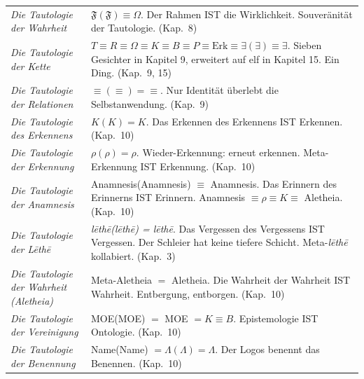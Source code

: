 \documentclass[10pt, openany, oneside]{book}
\renewcommand{\footnotesize}{\fontsize{8.5}{11}\selectfont}
\begin{document}
{\footnotesize
\noindent\begin{tabular}{@{} p{} @{\hspace{0.5em}} p{} @{}}

\textit{Die Tautologie der Wahrheit} & $\mathfrak{F}(\mathfrak{F}) \equiv \Omega$. Der Rahmen IST die Wirklichkeit. Souveränität der Tautologie. (Kap.\ 8) \\[0.3em]

\textit{Die Tautologie der Kette} & $T \equiv R \equiv \Omega \equiv K \equiv B \equiv P \equiv \text{Erk} \equiv \exists(\exists) \equiv \exists$. Sieben Gesichter in Kapitel 9, erweitert auf elf in Kapitel 15. Ein Ding. (Kap.\ 9, 15) \\[0.3em]

\textit{Die Tautologie der Relationen} & $\equiv(\equiv) = \equiv$. Nur Identität überlebt die Selbstanwendung. (Kap.\ 9) \\[0.3em]

\textit{Die Tautologie des Erkennens} & $K(K) = K$. Das Erkennen des Erkennens IST Erkennen. (Kap.\ 10) \\[0.3em]

\textit{Die Tautologie der Erkennung} & $\rho(\rho) = \rho$. Wieder-Erkennung: erneut erkennen. Meta-Erkennung IST Erkennung. (Kap.\ 10) \\[0.3em]

\textit{Die Tautologie der Anamnesis} & Anamnesis(Anamnesis) $\equiv$ Anamnesis. Das Erinnern des Erinnerns IST Erinnern. Anamnesis $\equiv \rho \equiv K \equiv$ Aletheia. (Kap.\ 10) \\[0.3em]

\textit{Die Tautologie der L\={e}th\={e}} & \textit{l\={e}th\={e}(l\={e}th\={e}) = l\={e}th\={e}}. Das Vergessen des Vergessens IST Vergessen. Der Schleier hat keine tiefere Schicht. Meta-\textit{l\={e}th\={e}} kollabiert. (Kap.\ 3) \\[0.3em]

\textit{Die Tautologie der Wahrheit (\textit{Aletheia})} & Meta-Aletheia $=$ Aletheia. Die Wahrheit der Wahrheit IST Wahrheit. Entbergung, entborgen. (Kap.\ 10) \\[0.3em]

\textit{Die Tautologie der Vereinigung} & MOE(MOE) $=$ MOE $= K \equiv B$. Epistemologie IST Ontologie. (Kap.\ 10) \\[0.3em]

\textit{Die Tautologie der Benennung} & Name(Name) $= \Lambda(\Lambda) = \Lambda$. Der Logos benennt das Benennen. (Kap.\ 10) \\[0.3em]


\end{tabular}}
\end{document}
